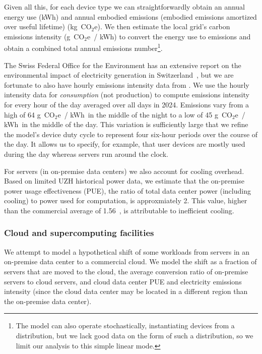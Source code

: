 \documentclass[11pt]{article}
\newcommand{\coe}{CO$_2$e}
\newcommand{\gcoe}{g~\coe}
\newcommand{\kgcoe}{k\gcoe}
\newcommand{\gcoekwh}{\gcoe\ / kWh}
\let\cite\parencite
\begin{document}
Given all this, for each device type we can straightforwardly obtain an annual energy use (kWh) and annual embodied emissions (embodied emissions amortized over useful lifetime) (\kgcoe). We then estimate the local grid's carbon emissions intensity (\gcoekwh) to convert the energy use to emissions and obtain a combined total annual emissions number\footnote{The model can also operate stochastically, instantiating devices from a distribution, but we lack good data on the  form of such a distribution, so we limit our analysis to this simple linear mode.}.

The Swiss Federal Office for the Environment has an extensive report on the environmental impact of electricity generation in Switzerland~\cite{krebs2018umweltbilanz}, but we are fortunate to also have hourly emissions intensity data from \textcite{electricitymaps}. We use the hourly intensity data for {\em consumption} (not production) to compute emissions intensity for every hour of the day averaged over all days in 2024. Emissions vary from a high of 64 \gcoekwh\ in the middle of the night to a low of 45 \gcoekwh\ in the middle of the day. This variation is sufficiently large that we refine the model's device duty cycle to represent four six-hour periods over the course of the day. It allows us to specify, for example, that user devices are mostly used during the day whereas servers run around the clock.

For servers (in on-premise data centers) we also account for cooling overhead. Based on limited UZH historical power data, we estimate that the on-premise power usage effectiveness (PUE), the ratio of total data center power (including cooling) to power used for computation, is approxmiately 2. This value, higher than the commercial average of 1.56~\cite{google:datacenter:efficiency}, is attributable to inefficient cooling.

\subsubsection*{Cloud and supercomputing facilities}

We attempt to model a hypothetical shift of some workloads from servers in an on-premise data center to a commercial cloud. We model the shift as a fraction of servers that are moved to the cloud, the average conversion ratio of on-premise servers to cloud servers, and cloud data center PUE and electricity emissions intensity (since the cloud data center may be located in a different region than the on-premise data center).
\end{document}
